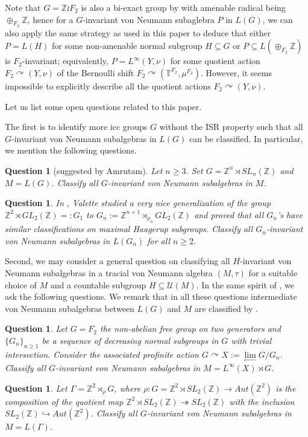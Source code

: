 \documentclass[12pt]{amsart}
\newtheorem{question}[theorem]{Question}
\theoremstyle{definition}
\theoremstyle{remark}
\begin{document}
Note that $G=\mathbb{Z}\wr F_2$ is also a bi-exact group by \cite[Corollary 15.3.9]{bo} with amenable radical being $\oplus_{F_2}\mathbb{Z}$, hence for a  $G$-invariant von Neumann subaglebra $P$ in $L(G)$, we can also apply the same strategy as used in this paper to deduce that either $P=L(H)$ for some non-amenable normal subgroup $H\subseteq G$ or $P\subseteq L(\oplus_{F_2}\mathbb{Z})$ is $F_2$-invariant; equivalently, $P=L^{\infty}(Y,\nu)$ for some quotient action $F_2\curvearrowright (Y,\nu)$ of the Bernoulli shift $F_2\curvearrowright (\mathbb{T}^{F_2},\mu^{F_2})$. However, it seems impossible to explicitly describe all the quotient actions $F_2\curvearrowright (Y,\nu)$. 



Let us list some open questions related to this paper.

The first is to identify more icc groups $G$ without the ISR property such that all $G$-invariant von Neumann subalgebras in $L(G)$ can be classified. In particular, we mention the following questions.

\begin{question}[suggested by Amrutam]
Let $n\geq 3$. Set $G=\mathbb{Z}^n\rtimes SL_n(\mathbb{Z})$ and $M=L(G)$. Classify all $G$-invariant von Neumann subalgebras in $M$.
\end{question}
\begin{question}
In \cite{val}, Valette studied a very nice generalization of the group $\mathbb{Z}^2\rtimes GL_2(\mathbb{Z})=:G_1$ to $G_n:=\mathbb{Z}^{n+1}\rtimes_{\rho_n}GL_2(\mathbb{Z})$ and proved that all $G_n$'s have similar classifications on maximal Haagerup subgroups. Classify all $G_n$-invariant von Neumann subalgebras in $L(G_n)$ for all $n\geq 2$.
\end{question}

Second, we may consider a general question on classifying all $H$-invariant von Neumann subalgebras in a tracial von Neumann algebra $(M,\tau)$ for a suitable choice of $M$ and a countable subgroup $H\subseteq \mathcal{U}(M)$. In the same spirit of \cite[Conjecture]{ah}, we ask the following questions. We remark that in all these questions intermediate von Neumann subalgebras between $L(G)$ and $M$ are classified by \cites{cd, wit, jiang_jot}.
\begin{question}
Let $G=F_2$ the non-abelian free group on two generators and $\{G_n\}_{n\geq 1}$ be a sequence of decreasing normal subgroups in $G$ with trivial intersection. Consider the associated profinite action $G\curvearrowright X:=\lim\limits_{\leftarrow}G/G_n$. Classify all $G$-invariant von Neumann subalgebras in $M=L^{\infty}(X)\rtimes G$. 
\end{question}
\begin{question}
Let $\Gamma=\mathbb{Z}^2\rtimes_{\rho} G$, where $\rho: G=\mathbb{Z}^2\rtimes SL_2(\mathbb{Z})\rightarrow Aut(\mathbb{Z}^2)$ is the composition of the quotient map  $\mathbb{Z}^2\rtimes SL_2(\mathbb{Z})\twoheadrightarrow SL_2(\mathbb{Z})$ with the inclusion $SL_2(\mathbb{Z})\hookrightarrow Aut(\mathbb{Z}^2)$. Classify all $G$-invariant von Neumann subalgebras in $M=L(\Gamma)$.
\end{question}
\end{document}
